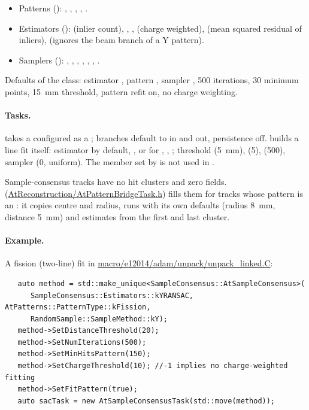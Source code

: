 \begin{itemize}
\item Patterns (): , , , ,
  .
\item Estimators ():  (inlier count), ,
  ,  (charge weighted),  (mean squared residual of inliers),
   (ignores the beam branch of a Y pattern).
\item Samplers (): , ,
  , , , , .
\end{itemize}
Defaults of the class: estimator , pattern , sampler , 500
iterations, 30 minimum points, 15~mm threshold, pattern refit on, no charge weighting.

\paragraph{Tasks.}  takes a configured  as a
; branches default to  in and  out, persistence
off.  builds a line fit itself: estimator  by default, ,
 or  for , , ; threshold
 (5~mm),  (5),  (500), sampler
 (0, uniform). The  member set by  is not used in
.

Sample-consensus tracks have no hit clusters and zero  fields. 
(\url{AtReconstruction/AtPatternBridgeTask.h}) fills them for tracks whose pattern is an
: it copies centre and radius, runs  with its own
defaults (radius 8~mm, distance 5~mm) and estimates  from the first and last cluster.

\paragraph{Example.} A fission (two-line) fit in \url{macro/e12014/adam/unpack/unpack_linked.C}:
\begin{verbatim}
   auto method = std::make_unique<SampleConsensus::AtSampleConsensus>(
      SampleConsensus::Estimators::kYRANSAC, AtPatterns::PatternType::kFission,
      RandomSample::SampleMethod::kY);
   method->SetDistanceThreshold(20);
   method->SetNumIterations(500);
   method->SetMinHitsPattern(150);
   method->SetChargeThreshold(10); //-1 implies no charge-weighted fitting
   method->SetFitPattern(true);
   auto sacTask = new AtSampleConsensusTask(std::move(method));
\end{verbatim}

